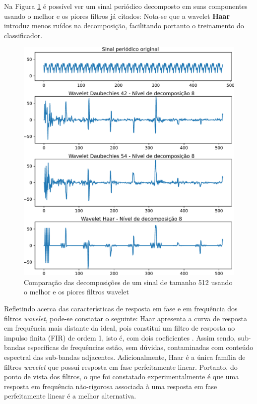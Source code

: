 	\par Na Figura \ref{fig:haardaub42comparison} é possível ver um sinal periódico decomposto em suas componentes usando o melhor e os piores filtros já citados: Nota-se que a wavelet \textbf{Haar} introduz menos ruídos na decomposição, facilitando portanto o treinamento do classificador.

	\begin{figure}[H]
		\centering
		\includegraphics[scale=.6]{images/results/haarDaubComparison/haarDaub42Comparison}
		\caption{Comparação das decomposições de um sinal de tamanho 512 usando o melhor e os piores filtros wavelet}
		\label{fig:haardaub42comparison}
	\end{figure}
		
	\par Refletindo acerca das características de resposta em fase e em frequência dos filtros \textit{wavelet}, pode-se constatar o seguinte: Haar apresenta a curva de resposta em frequência mais distante da ideal, pois constitui um filtro de resposta ao impulso finita (FIR) de ordem 1, isto é, com dois coeficientes \cite{WaveletPropertiesBrowser}. Assim sendo, sub-bandas específicas de frequências estão, sem dúvidas, contaminadas com conteúdo espectral das sub-bandas adjacentes. Adicionalmente, Haar é a única família de filtros \textit{wavelet} que possui resposta em fase perfeitamente linear. Portanto, do ponto de vista dos filtros, o que foi constatado experimentalmente é que uma resposta em frequência não-rigorosa associada à uma resposta em fase perfeitamente linear é a melhor alternativa. \\
	
